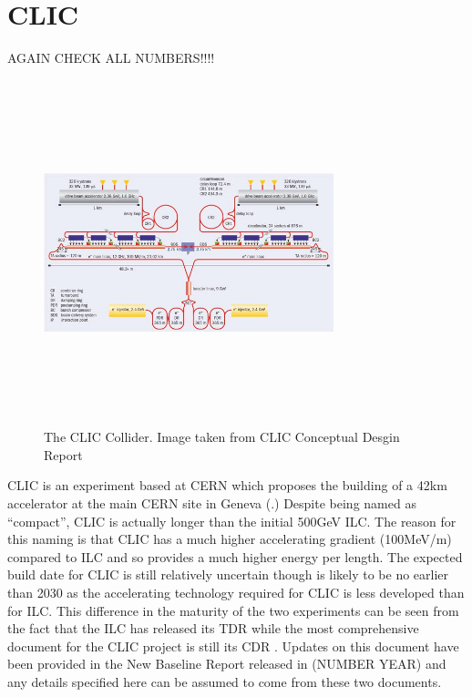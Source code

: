 \section{CLIC}
AGAIN CHECK ALL NUMBERS!!!!

\begin{figure}
  \centering
  \includegraphics[width=0.75\textwidth,height=10cm,keepaspectratio]{Experiments/fig/clic}
  \caption[The CLIC Experiment]{The CLIC Collider. Image taken from CLIC Conceptual Desgin Report\cite{CDR}}
  \label{Fig:CLIC}
\end{figure}
\ac{CLIC} is an experiment based at CERN which proposes the building of a 42km accelerator at the main CERN site in Geneva (.) Despite being named as “compact”, \ac{CLIC} is actually longer than the initial 500GeV \ac{ILC}. The reason for this naming is that \ac{CLIC} has a much higher accelerating gradient (100MeV/m) compared to ILC and so provides a much higher energy per length. The expected build date for \ac{CLIC} is still relatively uncertain though is likely to be no earlier than 2030 as the accelerating technology required for \ac{CLIC} is less developed than for \ac{ILC}. This difference in the maturity of the two experiments can be seen from the fact that the \ac{ILC} has released its \ac{TDR} while the most comprehensive document for the CLIC project is still its \ac{CDR} \cite{CDR}. Updates on this document have been provided in the New Baseline Report \cite{UpdatedCLICBaseline} released  in (NUMBER YEAR) and any details specified here can be assumed to come from these two documents. 

